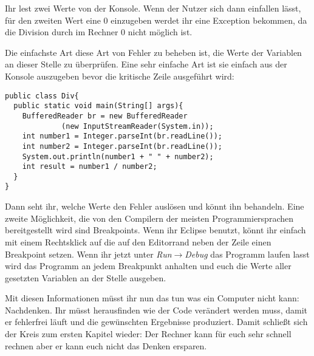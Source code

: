 Ihr lest zwei Werte von der Konsole. Wenn  der Nutzer sich dann einfallen lässt, für den zweiten Wert eine 0 einzugeben werdet ihr eine Exception bekommen, da die Division durch im Rechner 0 nicht möglich ist.

Die einfachste Art diese Art von Fehler zu beheben ist, die Werte der Variablen an dieser Stelle zu überprüfen. Eine sehr einfache Art ist sie einfach aus der Konsole auszugeben bevor die kritische Zeile ausgeführt wird:

\begin{minipage}{\textwidth}
\begin{lstlisting}
public class Div{
  public static void main(String[] args){
    BufferedReader br = new BufferedReader
             (new InputStreamReader(System.in));
    int number1 = Integer.parseInt(br.readLine());
    int number2 = Integer.parseInt(br.readLine());
    System.out.println(number1 + " " + number2);
    int result = number1 / number2;
  }
}
\end{lstlisting}
\end{minipage}

Dann seht ihr, welche Werte den Fehler auslösen und könnt ihn behandeln. Eine zweite Möglichkeit, die von den Compilern der meisten Programmiersprachen bereitgestellt wird sind Breakpoints. Wenn ihr Eclipse benutzt, könnt ihr einfach mit einem Rechtsklick auf die auf den Editorrand neben der Zeile einen Breakpoint setzen. Wenn ihr jetzt unter \textit{Run$\rightarrow$Debug} das Programm laufen lasst wird das Programm an jedem Breakpunkt anhalten und euch die Werte aller gesetzten Variablen an der Stelle ausgeben.

Mit diesen Informationen müsst ihr nun das tun was ein Computer nicht kann: Nachdenken. Ihr müsst herausfinden wie der Code verändert werden muss, damit er fehlerfrei läuft und die gewünschten Ergebnisse produziert. Damit schließt sich der Kreis zum ersten Kapitel wieder: Der Rechner kann für euch sehr schnell rechnen aber er kann euch nicht das Denken ersparen.